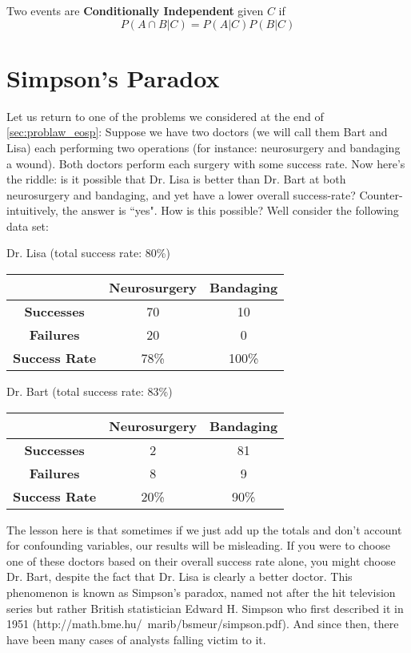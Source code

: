 \documentclass{report}
\begin{document}
Two events are \textbf{Conditionally Independent} given $C$ if 
\[
    P(A\cap B | C)= P(A|C)P(B|C)
\]

\todo






\section{Simpson's Paradox}
Let us return to one of the problems we considered at the end of \ref{sec:problaw_eosp}: Suppose we have two doctors (we will call them Bart and Lisa) each performing two operations (for instance: neurosurgery and bandaging a wound). Both doctors perform each surgery with some success rate. Now here's the riddle: is it possible that Dr. Lisa is better than Dr. Bart at both neurosurgery and bandaging, and yet have a lower overall success-rate? Counter-intuitively, the answer is ``yes". How is this possible? Well consider the following data set:
\vspace{15px}
\begin{center}
Dr. Lisa (total success rate: 80\%)\\
\vspace{5px}
\begin{tabular}{c|cc }
& \textbf{Neurosurgery} & \textbf{Bandaging} \\ 
\hline
\textbf{Successes} & 70 & 10 \\  
\textbf{Failures} & 20 & 0 \\
\hline
\textbf{Success Rate} & 78\% & 100\% 
\end{tabular}
\end{center}

\vspace{15px}
\begin{center}
Dr. Bart (total success rate: 83\%)\\
\vspace{5px}
\begin{tabular}{c|cc}
&\textbf{Neurosurgery} & \textbf{Bandaging} \\ 
\hline
\textbf{Successes} & 2 & 81 \\  
\textbf{Failures} & 8 & 9 \\
\hline
\textbf{Success Rate} & 20\% & 90\% 
\end{tabular}
\vspace{15px}
\end{center}

The lesson here is that sometimes if we just add up the totals and don't account for confounding variables, our results will be misleading. If you were to choose one of these doctors based on their overall success rate alone, you might choose Dr. Bart, despite the fact that Dr. Lisa is clearly a better doctor. This phenomenon is known as Simpson's paradox, named not after the hit television series but rather British statistician Edward H. Simpson who first described it in 1951 (\todo http://math.bme.hu/~marib/bsmeur/simpson.pdf). And since then, there have been many cases of analysts falling victim to it.
\end{document}
